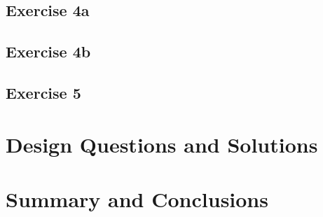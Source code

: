 \subsection{Exercise 4a}

\subsection{Exercise 4b}

\subsection{Exercise 5}


\newpage\section{Design Questions and Solutions}


\newpage\section{Summary and Conclusions}


\newpage{}



